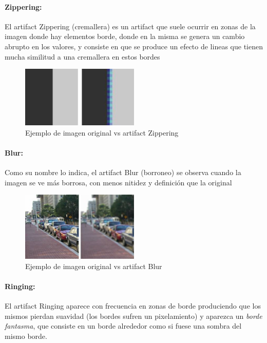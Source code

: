 \paragraph{Zippering:}
El artifact Zippering (cremallera) es un artifact que suele ocurrir en zonas de la imagen donde hay elementos borde, donde en la misma se genera un cambio abrupto en los valores, y consiste en que se produce un efecto de lineas que tienen mucha similitud a una cremallera en estos bordes

\begin{figure}[htb]
\begin{center}
       \includegraphics[width=0.5\textwidth]{imagenes/zippering_example.jpeg}
       \caption{Ejemplo de imagen original vs artifact Zippering}
       \end{center}

\end{figure}
\paragraph{Blur:}
Como su nombre lo indica, el artifact Blur (borroneo) se observa cuando la imagen se ve más borrosa, con menos nitidez y definición que la original

\begin{figure}[htb]
\begin{center}
       \includegraphics[width=0.5\textwidth]{imagenes/blur_example.jpg}
       \caption{Ejemplo de imagen original vs artifact Blur}
       \end{center}

\end{figure}


\paragraph{Ringing:}
El artifact Ringing aparece con frecuencia en zonas de borde  produciendo que los mismos pierdan suavidad (los bordes sufren un pixelamiento) y aparezca un \textit{borde fantasma}, que consiste en un borde alrededor como si fuese una sombra del mismo borde.


